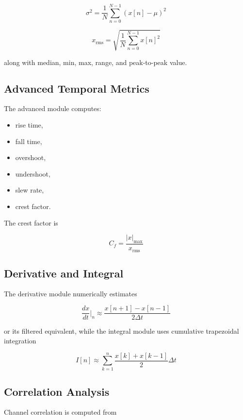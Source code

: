 \documentclass[conference]{IEEEtran}
\begin{document}
\begin{equation}
\sigma^2 = \frac{1}{N}\sum_{n=0}^{N-1} (x[n]-\mu)^2
\end{equation}

\begin{equation}
x_{\mathrm{rms}} = \sqrt{\frac{1}{N}\sum_{n=0}^{N-1} x[n]^2}
\end{equation}

along with median, min, max, range, and peak-to-peak value.

\subsection{Advanced Temporal Metrics}
The advanced module computes:

\begin{itemize}
    \item rise time,
    \item fall time,
    \item overshoot,
    \item undershoot,
    \item slew rate,
    \item crest factor.
\end{itemize}

The crest factor is

\begin{equation}
C_f = \frac{|x|_{\max}}{x_{\mathrm{rms}}}
\end{equation}

\subsection{Derivative and Integral}
The derivative module numerically estimates

\begin{equation}
\frac{dx}{dt}\Big|_{n} \approx \frac{x[n+1]-x[n-1]}{2\Delta t}
\end{equation}

or its filtered equivalent, while the integral module uses cumulative trapezoidal integration

\begin{equation}
I[n] \approx \sum_{k=1}^{n}\frac{x[k] + x[k-1]}{2}\Delta t
\end{equation}

\subsection{Correlation Analysis}
Channel correlation is computed from
\end{document}
